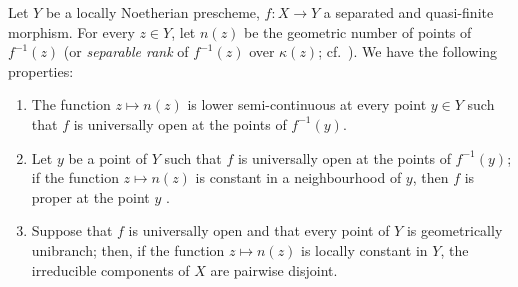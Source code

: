 \begin{proposition}[15.5.1]
\label{IV.15.5.1}
Let $Y$ be a locally Noetherian prescheme, $f:X\to Y$ a separated and quasi-finite morphism.
For every $z\in Y$, let $n(z)$ be the geometric number of points of $f^{-1}(z)$ (or \emph{separable rank} of $f^{-1}(z)$ over $\kappa(z)$; cf.\ ).
We have the following properties:
\begin{enumerate}[label=(\roman*)]
  \item The function $z\mapsto n(z)$ is lower semi-continuous at every point $y\in Y$ such that $f$ is universally open at the points of $f^{-1}(y)$.
  \item Let $y$ be a point of $Y$ such that $f$ is universally open at the points of $f^{-1}(y)$; if the function $z\mapsto n(z)$ is constant in a neighbourhood of $y$, then $f$ is proper at the point $y$ .
  \item Suppose that $f$ is universally open and that every point of $Y$ is geometrically unibranch; then, if the function $z\mapsto n(z)$ is locally constant in $Y$, the irreducible components of $X$ are pairwise disjoint.
\end{enumerate}
\end{proposition}

